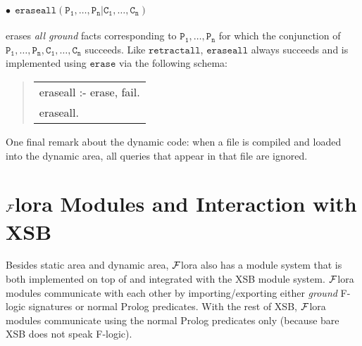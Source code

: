 \documentclass[11pt]{article}
\newenvironment{qrules}{\begin{quote}\sf\begin{tabular}[t]{l}}%
{\end{tabular}\end{quote}}
\newcommand{\FLORA}{{\mbox{${\cal F}${\sc lora}}}\xspace}
\newcommand{\fl}{{F-logic}\xspace}
\begin{document}
\paragraph{$\bullet~~\mathtt{eraseall(P_1,\ldots,P_n | C_1,\ldots,C_n)}$} erases \emph{all ground}
facts corresponding to $\mathtt{P_1,\ldots,P_n}$ for which the conjunction
of $\mathtt{P_1,\ldots,P_n,C_1,\ldots,C_n}$ succeeds. Like
$\mathtt{retractall}$, $\mathtt{eraseall}$ always succeeds and is
implemented using $\mathtt{erase}$ via the following schema:
\begin{qrules}
eraseall :- erase, fail. \\
eraseall.
\end{qrules}

One final remark about the dynamic code: when a file is compiled and loaded
into the dynamic area, all queries that appear in that file are ignored.

\section{\FLORA Modules and Interaction with XSB}\label{sec-module}

Besides static area and dynamic area, \FLORA also has a module system that
is both implemented on top of and integrated with the XSB module system.
\FLORA modules communicate with each other by importing/exporting either
\emph{ground} \fl signatures or normal Prolog predicates. With the rest of
XSB, \FLORA modules communicate using the normal Prolog predicates only
(because bare XSB does not speak F-logic).
\end{document}
